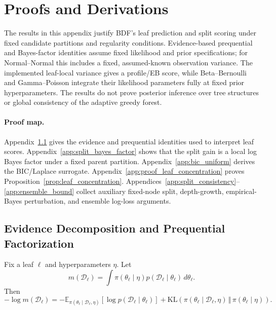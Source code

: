\section{Proofs and Derivations}\label{app:proofs}

The results in this appendix justify BDF's leaf prediction and split scoring under fixed candidate partitions and regularity conditions. Evidence-based prequential and Bayes-factor identities assume fixed likelihood and prior specifications; for Normal--Normal this includes a fixed, assumed-known observation variance. The implemented leaf-local variance gives a profile/EB score, while Beta--Bernoulli and Gamma--Poisson integrate their likelihood parameters fully at fixed prior hyperparameters. The results do not prove posterior inference over tree structures or global consistency of the adaptive greedy forest.

\paragraph{Proof map.}
Appendix~\ref{app:evidence_decomposition} gives the evidence and prequential identities used to interpret leaf scores. Appendix~\ref{app:split_bayes_factor} shows that the split gain is a local log Bayes factor under a fixed parent partition. Appendix~\ref{app:bic_uniform} derives the BIC/Laplace surrogate. Appendix~\ref{app:proof_leaf_concentration} proves Proposition~\ref{prop:leaf_concentration}. Appendices~\ref{app:split_consistency}--\ref{app:ensemble_bound} collect auxiliary fixed-node split, depth-growth, empirical-Bayes perturbation, and ensemble log-loss arguments.

\subsection{Evidence Decomposition and Prequential Factorization}
\label{app:evidence_decomposition}

\begin{lemma}
Fix a leaf $\ell$ and hyperparameters $\eta$. Let
\[
m(\mathcal{D}_\ell)
=
\int \pi(\theta_\ell\mid\eta)
p(\mathcal{D}_\ell\mid\theta_\ell)\,d\theta_\ell .
\]
Then
\[
-\log m(\mathcal{D}_\ell)
=
-\mathbb{E}_{\pi(\theta_\ell\mid \mathcal{D}_\ell,\eta)}
\!\left[\log p(\mathcal{D}_\ell\mid\theta_\ell)\right]
+
\mathrm{KL}\!\left(
\pi(\theta_\ell\mid\mathcal{D}_\ell,\eta)
\,\Vert\,
\pi(\theta_\ell\mid\eta)
\right).
\]
\end{lemma}

